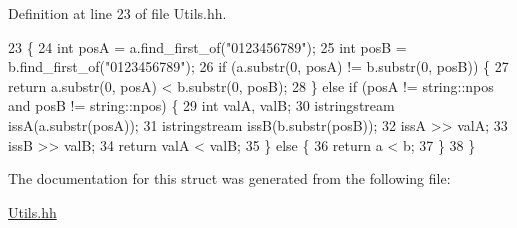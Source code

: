 Definition at line 23 of file Utils.\+hh.


\begin{DoxyCode}
23                                                           \{
24             \textcolor{keywordtype}{int} posA = a.find\_first\_of(\textcolor{stringliteral}{"0123456789"});
25             \textcolor{keywordtype}{int} posB = b.find\_first\_of(\textcolor{stringliteral}{"0123456789"});
26             \textcolor{keywordflow}{if} (a.substr(0, posA) != b.substr(0, posB)) \{
27                 \textcolor{keywordflow}{return} a.substr(0, posA) < b.substr(0, posB);
28             \} \textcolor{keywordflow}{else} \textcolor{keywordflow}{if} (posA != string::npos and posB != string::npos) \{
29                 \textcolor{keywordtype}{int} valA, valB;
30                 istringstream issA(a.substr(posA));
31                 istringstream issB(b.substr(posB));
32                 issA >> valA;
33                 issB >> valB;
34                 \textcolor{keywordflow}{return} valA < valB;
35             \} \textcolor{keywordflow}{else} \{
36                 \textcolor{keywordflow}{return} a < b;
37             \}
38         \}
\end{DoxyCode}


The documentation for this struct was generated from the following file\+:\begin{DoxyCompactItemize}
\item 
\hyperlink{_utils_8hh}{Utils.\+hh}\end{DoxyCompactItemize}

